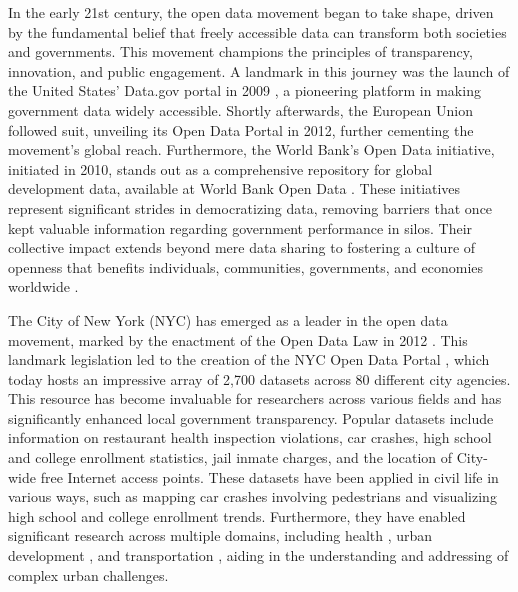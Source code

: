 \documentclass[linenumber]{jdsart}
\begin{document}
In the early 21st century, the open data movement began 
to take shape, driven by the fundamental belief that 
freely accessible data can transform both societies and 
governments. This movement champions the principles
of transparency, innovation, and public engagement. 
A landmark in this journey was the launch of the United States'
Data.gov portal in 2009 \citep{dataGov}, a pioneering
platform in making government data widely accessible. Shortly afterwards,
the European Union followed suit, unveiling its Open Data Portal 
\citep{dataEU} in 2012, further cementing the movement's 
global reach. Furthermore, the World Bank's Open
Data initiative, initiated in 2010, stands out as a comprehensive
repository for global development data, available at
World Bank Open Data \citep{dataWorldBank}. 
These initiatives represent significant strides in democratizing data, 
removing barriers that once kept valuable information 
regarding government performance in silos. Their collective impact 
extends beyond mere data sharing to fostering a culture of openness 
that benefits individuals, communities, governments, and economies worldwide 
\citep{barns2016mine, wang2016adoption}.


The City of New York (NYC) has emerged as a leader in the open data movement,
marked by the enactment of the Open Data Law in 2012
\citep{zuiderwijk2014open}. This landmark legislation led to the
creation of the NYC Open Data Portal \citep{dataNYC}, which 
today hosts an impressive array of 2,700 datasets
across 80 different city agencies. This resource has become invaluable
for researchers across various fields and has significantly enhanced
local government transparency. Popular datasets include information on
restaurant health inspection violations, car crashes, high school and
college enrollment statistics, jail inmate charges, and the location
of City-wide free Internet access points. These datasets have been
applied in civil life in various ways, such as mapping car crashes
involving pedestrians and visualizing high school and college
enrollment trends. Furthermore, they have enabled significant research
across multiple domains, including health \citep{cantor2018facets, 
shankar2021data}, urban development \citep{neves2020impacts}, and
transportation \citep{gerte2019understanding}, aiding in the
understanding and addressing of complex urban challenges.
\end{document}
